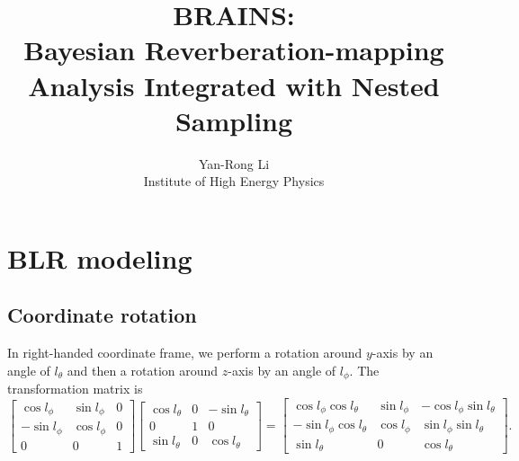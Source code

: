 \documentclass{book}
\begin{document}
\title{\bf BRAINS:\\
Bayesian Reverberation-mapping Analysis Integrated
with Nested Sampling}
\author{Yan-Rong Li\\
Institute of High Energy Physics}

\maketitle

\chapter{BLR modeling}

\section{Coordinate rotation}

In right-handed coordinate frame, we perform a rotation around $y$-axis by an angle of $l_\theta$ and 
then a rotation around $z$-axis by an angle of $l_\phi$. The transformation matrix is
\begin{equation}
\left[\begin{array}{ccc}
\cos l_\phi & \sin l_\phi & 0 \\
-\sin l_\phi &  \cos l_\phi & 0 \\
     0      &      0       & 1 
\end{array}\right]
\left[\begin{array}{ccc}
\cos l_\theta  & 0  & -\sin l_\theta\\
   0      &      1        &  0  \\
\sin l_\theta &  0  & \cos l_\theta 
\end{array}\right]=
\left[\begin{array}{ccc}
\cos l_\phi\cos l_\theta  & \sin l_\phi  & -\cos l_\phi\sin l_\theta\\
-\sin l_\phi\cos l_\theta      & \cos l_\phi        &  \sin l_\phi\sin l_\theta  \\
\sin l_\theta &  0  & \cos l_\theta 
\end{array}\right]
.
\end{equation}
\end{document}
